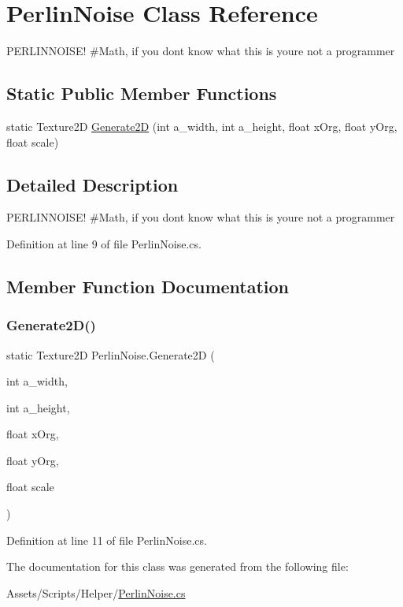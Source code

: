 \hypertarget{class_perlin_noise}{}\section{Perlin\+Noise Class Reference}
\label{class_perlin_noise}


P\+E\+R\+L\+I\+N\+N\+O\+I\+S\+E! \#\+Math, if you dont know what this is you\textquotesingle{}re not a programmer  


\subsection*{Static Public Member Functions}
\begin{DoxyCompactItemize}
\item 
static Texture2D \mbox{\hyperlink{class_perlin_noise_a801c6af1c01a5e1f3f5366f50911663a}{Generate2D}} (int a\+\_\+width, int a\+\_\+height, float x\+Org, float y\+Org, float scale)
\end{DoxyCompactItemize}


\subsection{Detailed Description}
P\+E\+R\+L\+I\+N\+N\+O\+I\+S\+E! \#\+Math, if you dont know what this is you\textquotesingle{}re not a programmer 



Definition at line 9 of file Perlin\+Noise.\+cs.



\subsection{Member Function Documentation}
\mbox{\label{class_perlin_noise_a801c6af1c01a5e1f3f5366f50911663a}} 
\subsubsection{\texorpdfstring{Generate2\+D()}{Generate2D()}}
{\footnotesize\ttfamily static Texture2D Perlin\+Noise.\+Generate2D (\begin{DoxyParamCaption}\item[{int}]{a\+\_\+width,  }\item[{int}]{a\+\_\+height,  }\item[{float}]{x\+Org,  }\item[{float}]{y\+Org,  }\item[{float}]{scale }\end{DoxyParamCaption})\hspace{0.3cm}{\ttfamily [static]}}



Definition at line 11 of file Perlin\+Noise.\+cs.



The documentation for this class was generated from the following file\+:\begin{DoxyCompactItemize}
\item 
Assets/\+Scripts/\+Helper/\mbox{\hyperlink{_perlin_noise_8cs}{Perlin\+Noise.\+cs}}\end{DoxyCompactItemize}
